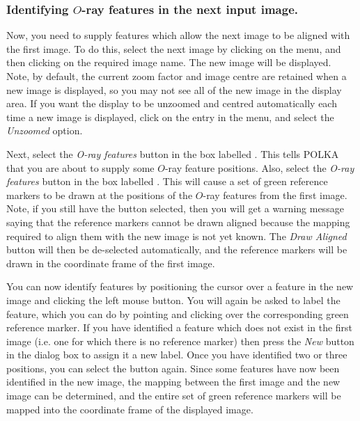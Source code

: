 \subsubsection {Identifying $O$-ray features in the next input image.}
Now, you need to supply features which allow the next image to be
aligned with the first image. To do this, select the next image by
clicking on the  menu, and then
clicking on the required image name. The new image will be displayed.
Note, by default, the current zoom factor and image centre are retained
when a new image is displayed, so you may not see all of the new image in
the display area. If you want the display to be unzoomed and centred
automatically each time a new image is displayed, click on the
 entry in the  menu, and select the {\em Unzoomed} option.

Next, select the {\em O-ray features} button in the box labelled
. This tells POLKA that you are
about to supply some $O$-ray feature positions. Also, select the 
{\em O-ray features} button in the box labelled
. This will cause
a set of green reference markers to be drawn at the positions of the
$O$-ray features from the first image. Note, if you still have the
 button selected, then
you will get a warning message saying that the reference markers cannot
be drawn aligned because the mapping required to align them with the new
image is not yet known. The {\em Draw Aligned} button will then be
de-selected automatically, and the reference markers will be drawn in the
coordinate frame of the first image.

You can now identify features by positioning the cursor over a feature in
the new image and clicking the left mouse button. You will again be asked
to label the feature, which you can do by pointing and clicking over the
corresponding green reference marker. If you have identified a feature
which does not exist in the first image (i.e. one for which there is no
reference marker) then press the {\em New} button in the  dialog box to assign it a new
label. Once you have identified two or three positions, you can select
the  button again. Since
some features have now been identified in the new image, the mapping
between the first image and the new image can be determined, and the
entire set of green reference markers will be mapped into the coordinate
frame of the displayed image. 

